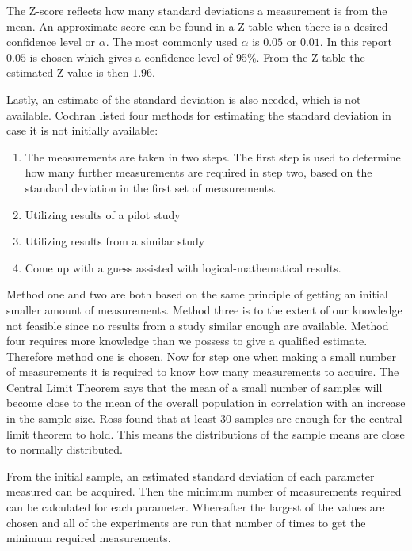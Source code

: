 The Z-score reflects how many standard deviations a measurement is from the mean. An approximate score can be found in a Z-table when there is a desired confidence level or $\alpha$. The most commonly used $\alpha$ is $0.05$ or $0.01$.\cite{kotrlik2001organizational} In this report $0.05$ is chosen which gives a confidence level of 95\%. From the Z-table the estimated Z-value is then $1.96$. 

Lastly, an estimate of the standard deviation is also needed, which is not available. Cochran listed four methods for estimating the standard deviation in case it is not initially available:
\begin{enumerate}
    \item The measurements are taken in two steps. The first step is used to determine how many further measurements are required in step two, based on the standard deviation in the first set of measurements.
    \item Utilizing results of a pilot study
    \item Utilizing results from a similar study
    \item Come up with a guess assisted with logical-mathematical results.
\end{enumerate}


Method one and two are both based on the same principle of getting an initial smaller amount of measurements. Method three is to the extent of our knowledge not feasible since no results from a study similar enough are available. Method four requires more knowledge than we possess to give a qualified estimate. Therefore method one is chosen. Now for step one when making a small number of measurements it is required to know how many measurements to acquire. The Central Limit Theorem says that the mean of a small number of samples will become close to the mean of the overall population in correlation with an increase in the sample size. Ross found that at least 30 samples are enough for the central limit theorem to hold\cite{Ross}. This means the distributions of the sample means are close to normally distributed.


From the initial sample, an estimated standard deviation of each parameter measured can be acquired. Then the minimum number of measurements required can be calculated for each parameter. Whereafter the largest of the values are chosen and all of the experiments are run that number of times to get the minimum required measurements.



